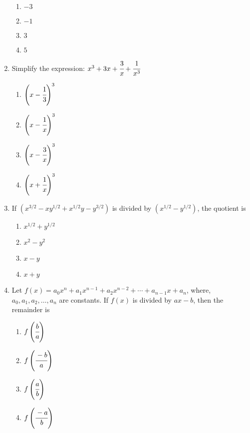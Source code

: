 \begin{multicols}{2}
\begin{enumerate}[label={\arabic*.}]
\begin{enumerate}[label={\Alph*.}]
        \item \(-3\)
        \item \(-1\)
        \item \(3\)
        \item \(5\)
      \end{enumerate}
    \item Simplify the expression: $x^3 + 3x + \cfrac{3}{x} + \cfrac{1}{x^3}$
      \begin{multicols}{2}
        \begin{enumerate}[label={\Alph*.}]
          \item \({\left(x - \cfrac{1}{3}\right)}^3\)
          \item \({\left(x - \cfrac{1}{x}\right)}^3\)
          \item \({\left(x - \cfrac{3}{x}\right)}^3\)
          \item \({\left(x + \cfrac{1}{x}\right)}^3\)
        \end{enumerate}
      \end{multicols}
    \item If $(x^{3/2} - xy^{1/2} + x^{1/2}y - y^{3/2})$ is divided by $(x^{1/2} - y^{1/2})$, the quotient is
      \begin{enumerate}[label={\Alph*.}]
        \item \(x^{1/2} + y^{1/2}\)
        \item \(x^2 - y^2\)
        \item \(x-y\)
        \item \(x+y\)
      \end{enumerate}
    \item Let $f(x) = a_{0}x^{n} + a_{1}x^{n-1} + a_{2}x^{n-2} + \cdots + a_{n-1}x + a_{n}$, where, $a_{0}, a_{1}, a_{2}, \ldots, a_{n}$ are constants. If $f(x)$ is divided by $ax -b$, then the remainder is
      \begin{enumerate}[label={\Alph*.}]
        \item \(f\left(\cfrac{b}{a}\right)\)
        \item \(f\left(\cfrac{-b}{a}\right)\)
        \item \(f\left(\cfrac{a}{b}\right)\)
        \item \(f\left(\cfrac{-a}{b}\right)\)
      \end{enumerate}
  \end{enumerate}
\end{multicols}
